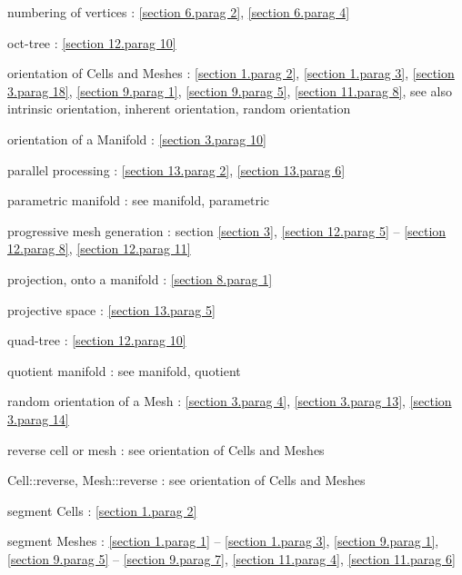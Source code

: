 \documentclass[a4paper]{scrreprt}
\def\numb{}
\newcommand\verm[1]{\textcolor{manif}{#1}}
\renewcommand\tt{\normalfont\ttfamily}
\begin{document}
\noindent
numbering of vertices :
\ref{\numb section 6.\numb parag 2}, \ref{\numb section 6.\numb parag 4}

\noindent
oct-tree : \ref{\numb section 12.\numb parag 10}

\noindent
orientation of {\small\tt \verm{Cell}}s and {\small\tt \verm{Mesh}}es :
\ref{\numb section 1.\numb parag 2}, \ref{\numb section 1.\numb parag 3},
\ref{\numb section 3.\numb parag 18}, \ref{\numb section 9.\numb parag 1},
\ref{\numb section 9.\numb parag 5}, \ref{\numb section 11.\numb parag 8},
\hfil\break\hskip 2cm
see also intrinsic orientation, inherent orientation, random orientation

\noindent
orientation of a {\small\tt \verm{Manifold}} : \ref{\numb section 3.\numb parag 10}

\noindent
parallel processing : \ref{\numb section 13.\numb parag 2}, \ref{\numb section 13.\numb parag 6}

\noindent
parametric manifold : see manifold, parametric

\noindent
progressive mesh generation : section \ref{\numb section 3},
\ref{\numb section 12.\numb parag 5} -- \ref{\numb section 12.\numb parag 8},
\ref{\numb section 12.\numb parag 11}

\noindent
projection, onto a manifold :
\ref{\numb section 8.\numb parag 1}

\noindent
projective space : \ref{\numb section 13.\numb parag 5}

\noindent
quad-tree : \ref{\numb section 12.\numb parag 10}

\noindent
quotient manifold : see manifold, quotient

\noindent
random orientation of a {\small\tt\verm{Mesh}} : \ref{\numb section 3.\numb parag 4},
\ref{\numb section 3.\numb parag 13}, \ref{\numb section 3.\numb parag 14}

\noindent
reverse cell or mesh : see orientation of {\small\tt \verm{Cell}}s and {\small\tt \verm{Mesh}}es

\noindent
{\small\tt\verm{Cell}::reverse}, {\small\tt\verm{Mesh}::reverse} :
see orientation of {\small\tt \verm{Cell}}s and {\small\tt \verm{Mesh}}es

\noindent
segment {\small\tt \verm{Cell}}s : \ref{\numb section 1.\numb parag 2}

\noindent
segment {\small\tt \verm{Mesh}}es :
\ref{\numb section 1.\numb parag 1} -- \ref{\numb section 1.\numb parag 3},
\ref{\numb section 9.\numb parag 1}, \ref{\numb section 9.\numb parag 5} --
\ref{\numb section 9.\numb parag 7}, \ref{\numb section 11.\numb parag 4},
\ref{\numb section 11.\numb parag 6}
\end{document}
